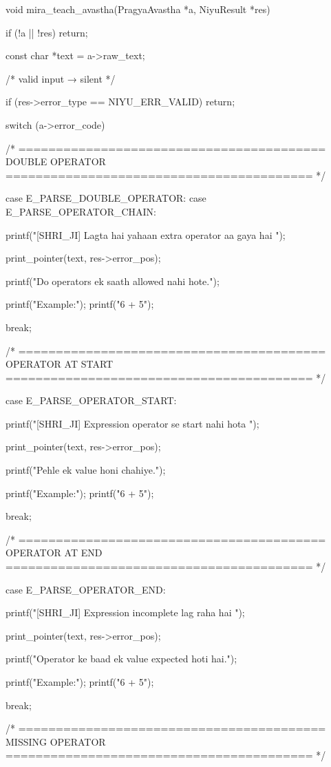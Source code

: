 \documentclass{article}
\begin{document}
void mira_teach_avastha(PragyaAvastha *a, NiyuResult *res)
{
    if (!a || !res)
        return;

    const char *text = a->raw_text;


    /* valid input → silent */

    if (res->error_type == NIYU_ERR_VALID)
        return;


    switch (a->error_code)
    {

    /* =========================================
       DOUBLE OPERATOR
    ========================================= */

    case E_PARSE_DOUBLE_OPERATOR:
    case E_PARSE_OPERATOR_CHAIN:

        printf("[SHRI_JI] Lagta hai yahaan extra operator aa gaya hai \n\n");

        print_pointer(text, res->error_pos);

        printf("Do operators ek saath allowed nahi hote.\n\n");

        printf("Example:\n");
        printf("6 + 5\n");

        break;


    /* =========================================
       OPERATOR AT START
    ========================================= */

    case E_PARSE_OPERATOR_START:

        printf("[SHRI_JI] Expression operator se start nahi hota \n\n");

        print_pointer(text, res->error_pos);

        printf("Pehle ek value honi chahiye.\n\n");

        printf("Example:\n");
        printf("6 + 5\n");

        break;


    /* =========================================
       OPERATOR AT END
    ========================================= */

    case E_PARSE_OPERATOR_END:

        printf("[SHRI_JI] Expression incomplete lag raha hai \n\n");

        print_pointer(text, res->error_pos);

        printf("Operator ke baad ek value expected hoti hai.\n\n");

        printf("Example:\n");
        printf("6 + 5\n");

        break;


    /* =========================================
       MISSING OPERATOR
    ========================================= */

}}
\end{document}
